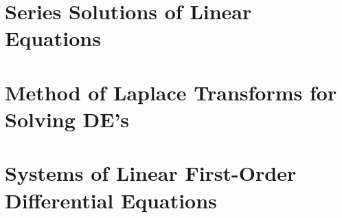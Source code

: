 \documentclass[title={MATH 252 - Introduction to Differential Equations Notes}]{math252notes}
\begin{document}
\chapter{Series Solutions of Linear Equations}\label{ch:series-solutions-of-linear-equations}

\chapter[The Laplace Transform]{Method of Laplace Transforms for Solving DE's}\label{ch:method-of-laplace-transforms-for-solving-de's}

\chapter{Systems of Linear First-Order Differential Equations}\label{ch:systems-of-linear-first-order-differential-equations}
\end{document}
